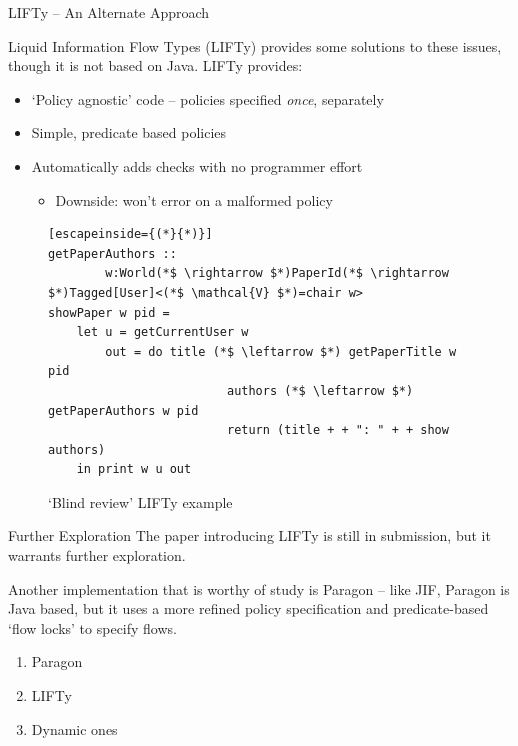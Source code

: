\begin{frame}[fragile]{LIFTy -- An Alternate Approach}
	
	Liquid Information Flow Types (LIFTy) provides some solutions to these issues, though it is not based on Java. LIFTy provides:
	
	\begin{itemize}
		\item `Policy agnostic' code -- policies specified \textit{once}, separately
		\item Simple, predicate based policies
		\item Automatically adds checks with no programmer effort
		\begin{itemize}
			\item Downside: won't error on a malformed policy
		\end{itemize}
	\end{itemize}
	
	\begin{figure}
		\begin{lstlisting}[escapeinside={(*}{*)}]
getPaperAuthors :: 
		w:World(*$ \rightarrow $*)PaperId(*$ \rightarrow $*)Tagged[User]<(*$ \mathcal{V} $*)=chair w>
showPaper w pid =
	let u = getCurrentUser w
		out = do title (*$ \leftarrow $*) getPaperTitle w pid
						 authors (*$ \leftarrow $*) getPaperAuthors w pid
						 return (title + + ": " + + show authors)
	in print w u out

		\end{lstlisting}
		\caption{`Blind review' LIFTy example \cite{work:lifty}}
	\end{figure}
	
	
\end{frame}

\begin{frame}{Further Exploration}
	The paper introducing LIFTy is still in submission, but it warrants further exploration.
	
	Another implementation that is worthy of study is Paragon -- like JIF, Paragon is Java based, but it uses a more refined policy specification and predicate-based `flow locks' to specify flows.
	
	\begin{enumerate}
		\item Paragon
		\item LIFTy
		\item Dynamic ones
	\end{enumerate}
\end{frame}

